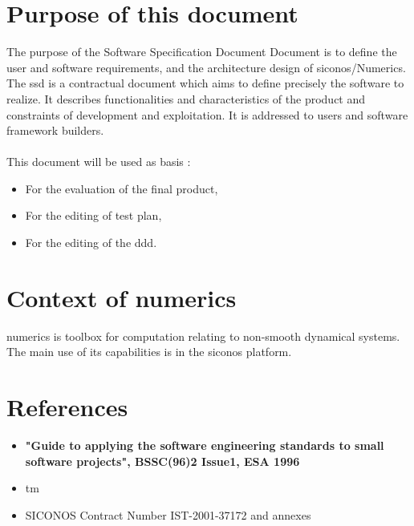 \section{Purpose of this document}
\label{Sec:SSD-Purpose-Scope}
The purpose of the Software Specification Document Document is to define the user and software requirements, and the architecture design of \ac{siconos}/Numerics.
The \ac{ssd} is a contractual document which aims to define precisely the software to realize. It describes functionalities and characteristics of the product and constraints of development and exploitation. It is addressed to users and software framework builders. \\
\\
This document will be used as basis : 
\begin{itemize}
\item For the evaluation of the final product,
\item For the editing of test plan,
\item For the editing of the \ac{ddd}.
\end{itemize}


\section{Context of \ac{numerics}}
\label{Sec:SSD-Context}
\ac{numerics} is toolbox for computation relating to non-smooth dynamical systems. The main use of its capabilities is in the \ac{siconos} platform.



\section{References}
\label{Sec:SSD-References}
\begin{itemize}
\item \textbf{"Guide to applying the software engineering standards to small software projects", BSSC(96)2 Issue1, ESA 1996}
\item \ac{tm}
\item \ac{SICONOS} Contract Number IST-2001-37172 and annexes

\end{itemize}




